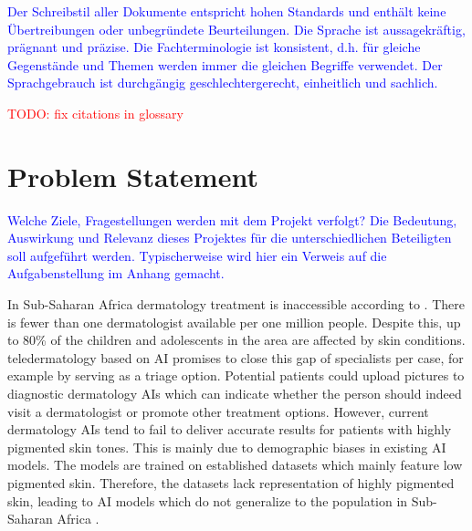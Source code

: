 \documentclass[12pt, a4paper, oneside]{book}   	%
\renewcommand{\todo}[1]{\textcolor{red}{TODO: #1}}
\newcommand{\baaCriteria}[1]{\textcolor{blue}{#1}}
\begin{document}
	
	\baaCriteria{Der Schreibstil aller Dokumente entspricht hohen Standards und enthält keine Übertreibungen oder unbegründete Beurteilungen. Die Sprache ist aussagekräftig, prägnant und präzise. Die Fachterminologie ist konsistent, d.h. für gleiche Gegenstände und Themen werden immer die gleichen Begriffe verwendet. Der Sprachgebrauch ist durchgängig geschlechtergerecht, einheitlich und sachlich.}
	
	\listoffigures
	\listoftables
	\printnoidxglossaries
	
	\todo{fix citations in glossary}
	
	\mainmatter
	
	
	\chapter{Problem Statement}
		\baaCriteria{Welche Ziele, Fragestellungen werden mit dem Projekt verfolgt? Die Bedeutung, Auswirkung und Relevanz dieses Projektes für die unterschiedlichen Beteiligten soll aufgeführt werden. Typischerweise wird hier ein Verweis auf die Aufgabenstellung im Anhang gemacht.}
		
		In Sub-Saharan Africa dermatology treatment is inaccessible according to \textcite{Gottfrois2024}. There is fewer than one dermatologist available per one million people. Despite this, up to 80\% of the children and adolescents in the area are affected by skin conditions. \Gls{teledermatology} based on \gls{AI} promises to close this gap of specialists per case, for example by serving as a triage option. Potential patients could upload pictures to diagnostic dermatology \glspl{AI} which can indicate whether the person should indeed visit a dermatologist or promote other treatment options. However, current dermatology \glspl{AI} tend to fail to deliver accurate results for patients with highly pigmented skin tones. This is mainly due to demographic biases in existing \gls{AI} models. The models are trained on established datasets which mainly feature low pigmented skin. Therefore, the datasets lack representation of highly pigmented skin, leading to AI models which do not generalize to the population in Sub-Saharan Africa \autocite{Gottfrois2024}.
		
\end{document}
